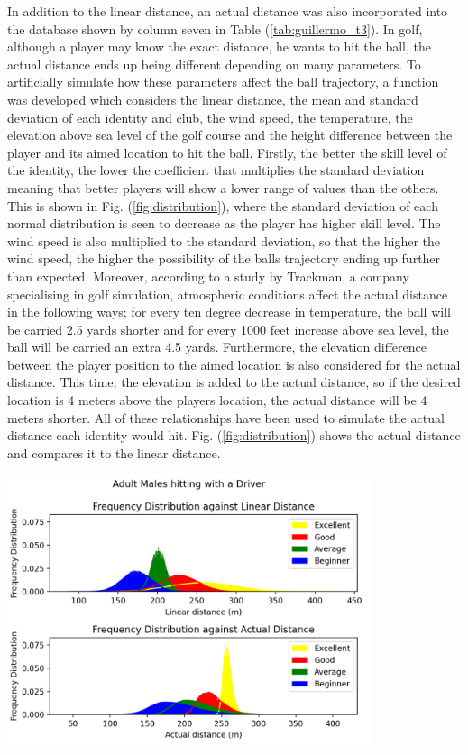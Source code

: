 \documentclass[11pt,landscape]{article}
\newenvironment{Figure}
  {\par\medskip\noindent\minipage{\linewidth}}
  {\endminipage\par\medskip}
\begin{document}
\begin{multicols}{3}
In addition to the linear distance, an actual distance was also incorporated
into the database shown by column seven in Table (\ref{tab:guillermo_t3}). In
golf, although a player may know the exact distance, he wants to hit the ball,
the actual distance ends up being different depending on many parameters. To
artificially simulate how these parameters affect the ball trajectory, a
function was developed which considers the linear distance, the mean and
standard deviation of each identity and club, the wind speed, the temperature,
the elevation above sea level of the golf course and the height difference
between the player and its aimed location to hit the ball. Firstly, the better
the skill level of the identity, the lower the coefficient that multiplies the
standard deviation meaning that better players will show a lower range of values
than the others. This is shown in Fig. (\ref{fig:distribution}), where the
standard deviation of each normal distribution is seen to decrease as the player
has higher skill level. The wind speed is also multiplied to the standard
deviation, so that the higher the wind speed, the higher the possibility of the
balls trajectory ending up further than expected. Moreover, according to a study
by Trackman, a company specialising in golf simulation, atmospheric conditions
affect the actual distance in the following ways; for every ten degree decrease
in temperature, the ball will be carried 2.5 yards shorter and for every 1000
feet increase above sea level, the ball will be carried an extra 4.5 yards.
Furthermore, the elevation difference between the player position to the aimed
location is also considered for the actual distance. This time, the elevation is
added to the actual distance, so if the desired location is 4 meters
above the players location, the actual distance will be 4 meters shorter. All of
these relationships have been used to simulate the actual distance each identity
would hit. Fig. (\ref{fig:distribution}) shows the actual distance and compares
it to the linear distance. 

\begin{Figure}
    \begin{center}
        \includegraphics[width=0.8\textwidth]{distribution.png}
        \label{fig:distribution}
    \end{center}
\end{Figure}


\end{multicols}
\end{document}
